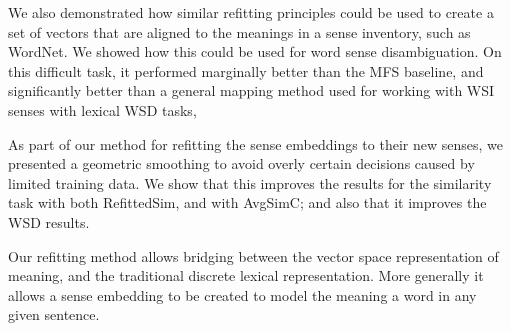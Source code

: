 \documentclass{sig-alternate}
\begin{document}
We also demonstrated how similar refitting principles could be used to create a set of vectors that are aligned to the meanings in a sense inventory, such as WordNet. We showed how this could be used for word sense disambiguation. On this difficult task, it performed marginally better than the MFS baseline, and significantly better than a general mapping method used for working with WSI senses with lexical WSD tasks,

As part of our method for refitting the sense embeddings to their new senses, we presented a geometric smoothing to avoid overly certain decisions caused by limited training data.
We show that this improves the results for the similarity task with both RefittedSim, and with AvgSimC; and also that it improves the WSD results.

Our refitting method allows bridging between the vector space representation of meaning, and the traditional discrete lexical representation. More generally it allows a sense embedding to be created to model the meaning a word in any given sentence.

\newpage
\printbibliography
\end{document}
